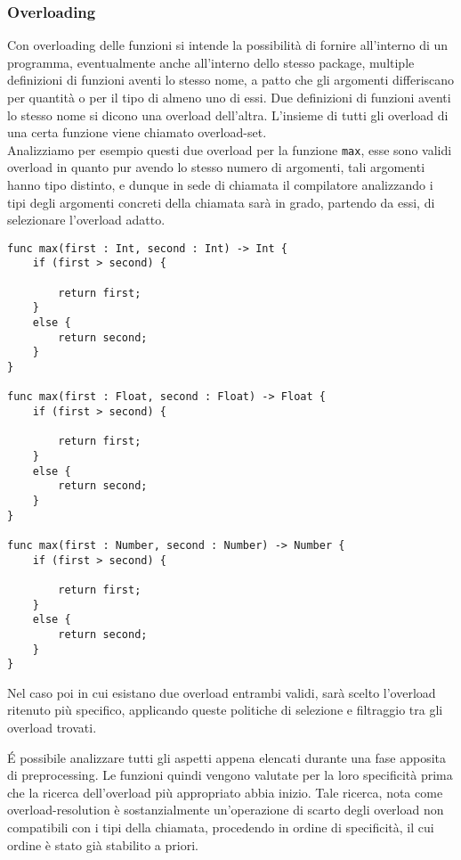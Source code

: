\subsubsection{Overloading}
Con overloading delle funzioni si intende la possibilità di fornire all’interno 
di un programma, eventualmente anche all’interno dello stesso package, multiple 
definizioni di funzioni aventi lo stesso nome, a patto che gli argomenti differiscano 
per quantità o per il tipo di almeno uno di essi. Due definizioni di funzioni 
aventi lo stesso nome si dicono una overload dell’altra. L’insieme di tutti 
gli overload di una certa funzione viene chiamato overload-set. \\

Analizziamo per esempio questi due overload per la funzione \texttt{max}, esse sono 
validi overload in quanto pur avendo lo stesso numero di argomenti, tali 
argomenti hanno tipo distinto, e dunque in sede di chiamata il compilatore 
analizzando i tipi degli argomenti concreti della chiamata sarà in grado, 
partendo da essi, di selezionare l’overload adatto. \\

\vspace{0.5cm}
\begin{lstlisting}[frame=single]
func max(first : Int, second : Int) -> Int { 
    if (first > second) {

        return first; 
    }
    else {
        return second;
    }
}

func max(first : Float, second : Float) -> Float {
    if (first > second) {

        return first; 
    }
    else {
        return second;
    }
}

func max(first : Number, second : Number) -> Number {
    if (first > second) {

        return first; 
    }
    else {
        return second;
    }
}
\end{lstlisting}
\vspace{0.5cm}

\newpage

Nel caso poi in cui esistano due overload entrambi validi, sarà scelto l’overload ritenuto 
più specifico, applicando queste politiche di selezione e filtraggio tra gli overload trovati.



É possibile analizzare tutti gli aspetti appena elencati durante una fase apposita 
di preprocessing. Le funzioni quindi vengono valutate per la loro specificità 
prima che la ricerca dell’overload più appropriato abbia inizio. Tale ricerca, 
nota come overload-resolution è sostanzialmente un’operazione di scarto degli 
overload non compatibili con i tipi della chiamata, procedendo in ordine di specificità, 
il cui ordine è stato già stabilito a priori. \\


